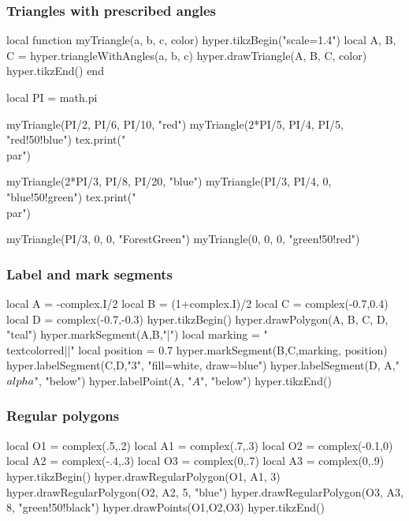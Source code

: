 \documentclass{article}
\begin{document}
\subsubsection{Triangles with prescribed angles}
\begin{codeandresult}
\begin{luacode*}
local function myTriangle(a, b, c, color)
	hyper.tikzBegin("scale=1.4")
	local A, B, C = hyper.triangleWithAngles(a, b, c)
	hyper.drawTriangle(A, B, C, color)
	hyper.tikzEnd()
end

local PI = math.pi

myTriangle(PI/2, PI/6, PI/10, "red")
myTriangle(2*PI/5, PI/4, PI/5, "red!50!blue")
tex.print("\\par")

myTriangle(2*PI/3, PI/8, PI/20, "blue")
myTriangle(PI/3, PI/4, 0, "blue!50!green")
tex.print("\\par")

myTriangle(PI/3, 0, 0, "ForestGreen")
myTriangle(0, 0, 0, "green!50!red")
\end{luacode*}
\end{codeandresult}


\subsubsection{Label and mark segments}
\begin{codeandresult}
\begin{luacode*}
local A = -complex.I/2
local B = (1+complex.I)/2
local C = complex(-0.7,0.4)
local D = complex(-0.7,-0.3)
hyper.tikzBegin()
hyper.drawPolygon(A, B, C, D, "teal")
hyper.markSegment(A,B,"|")
local marking = "\\textcolor{red}{||}"
local position = 0.7
hyper.markSegment(B,C,marking, position)
hyper.labelSegment(C,D,"$3$", "fill=white, draw=blue")
hyper.labelSegment(D, A,"$\\alpha$", "below")
hyper.labelPoint(A, "$A$", "below")
hyper.tikzEnd()
\end{luacode*}
\end{codeandresult}


\subsubsection{Regular polygons}
\begin{codeandresult}
\begin{luacode*}
local O1 = complex(.5,.2)
local A1 = complex(.7,.3)
local O2 = complex(-0.1,0)
local A2 = complex(-.4,.3)
local O3 = complex(0,.7)
local A3 = complex(0,.9)
hyper.tikzBegin()
hyper.drawRegularPolygon(O1, A1, 3)
hyper.drawRegularPolygon(O2, A2, 5, "blue")
hyper.drawRegularPolygon(O3, A3, 8, "green!50!black")
hyper.drawPoints(O1,O2,O3)
hyper.tikzEnd()
\end{luacode*}
\end{codeandresult}
\end{document}
